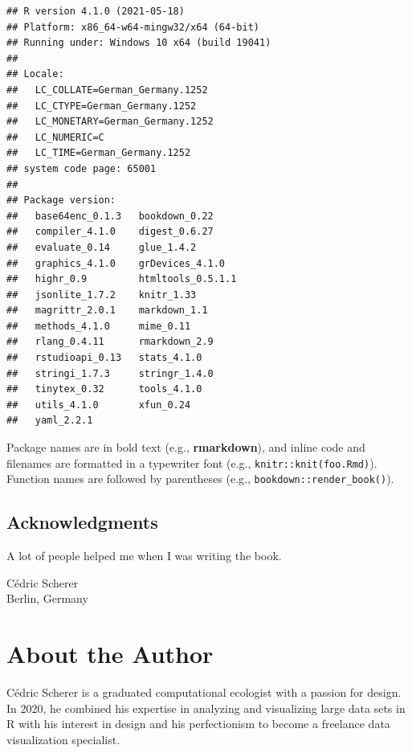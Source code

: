 \documentclass[
]{krantz}
\begin{document}
\begin{verbatim}
## R version 4.1.0 (2021-05-18)
## Platform: x86_64-w64-mingw32/x64 (64-bit)
## Running under: Windows 10 x64 (build 19041)
## 
## Locale:
##   LC_COLLATE=German_Germany.1252 
##   LC_CTYPE=German_Germany.1252   
##   LC_MONETARY=German_Germany.1252
##   LC_NUMERIC=C                   
##   LC_TIME=German_Germany.1252    
## system code page: 65001
## 
## Package version:
##   base64enc_0.1.3   bookdown_0.22    
##   compiler_4.1.0    digest_0.6.27    
##   evaluate_0.14     glue_1.4.2       
##   graphics_4.1.0    grDevices_4.1.0  
##   highr_0.9         htmltools_0.5.1.1
##   jsonlite_1.7.2    knitr_1.33       
##   magrittr_2.0.1    markdown_1.1     
##   methods_4.1.0     mime_0.11        
##   rlang_0.4.11      rmarkdown_2.9    
##   rstudioapi_0.13   stats_4.1.0      
##   stringi_1.7.3     stringr_1.4.0    
##   tinytex_0.32      tools_4.1.0      
##   utils_4.1.0       xfun_0.24        
##   yaml_2.2.1
\end{verbatim}

Package names are in bold text (e.g., \textbf{rmarkdown}), and inline code and filenames are formatted in a typewriter font (e.g., \texttt{knitr::knit(\textquotesingle{}foo.Rmd\textquotesingle{})}). Function names are followed by parentheses (e.g., \texttt{bookdown::render\_book()}).

\hypertarget{acknowledgments}{%
\section*{Acknowledgments}\label{acknowledgments}}


A lot of people helped me when I was writing the book.

\begin{flushright}
Cédric Scherer\\
Berlin, Germany
\end{flushright}

\hypertarget{about-the-author}{%
\chapter*{About the Author}\label{about-the-author}}


Cédric Scherer is a graduated computational ecologist with a passion for design. In 2020, he combined his expertise in analyzing and visualizing large data sets in R with his interest in design and his perfectionism to become a freelance data visualization specialist.
\end{document}
